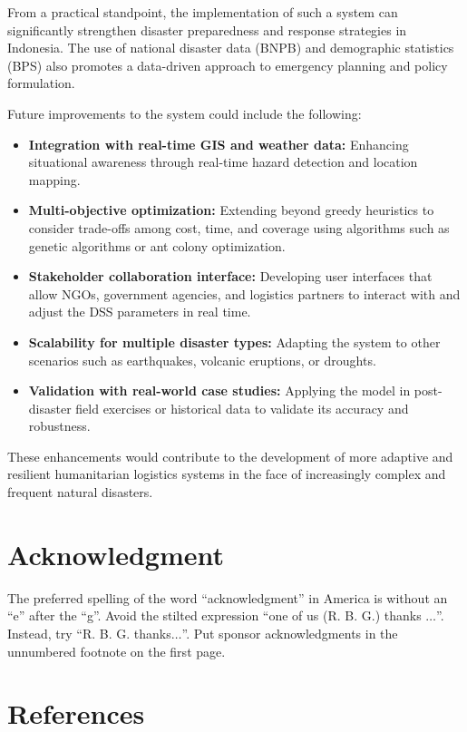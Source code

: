\documentclass[journal,final,a4paper,twoside,11pt]{IEEEtran}
\begin{document}
From a practical standpoint, the implementation of such a system can significantly strengthen disaster preparedness and response strategies in Indonesia. The use of national disaster data (BNPB) and demographic statistics (BPS) also promotes a data-driven approach to emergency planning and policy formulation.

Future improvements to the system could include the following:

\begin{itemize}
    \item \textbf{Integration with real-time GIS and weather data:} Enhancing situational awareness through real-time hazard detection and location mapping.
    \item \textbf{Multi-objective optimization:} Extending beyond greedy heuristics to consider trade-offs among cost, time, and coverage using algorithms such as genetic algorithms or ant colony optimization.
    \item \textbf{Stakeholder collaboration interface:} Developing user interfaces that allow NGOs, government agencies, and logistics partners to interact with and adjust the DSS parameters in real time.
    \item \textbf{Scalability for multiple disaster types:} Adapting the system to other scenarios such as earthquakes, volcanic eruptions, or droughts.
    \item \textbf{Validation with real-world case studies:} Applying the model in post-disaster field exercises or historical data to validate its accuracy and robustness.
\end{itemize}

These enhancements would contribute to the development of more adaptive and resilient humanitarian logistics systems in the face of increasingly complex and frequent natural disasters.


\section*{Acknowledgment}

The preferred spelling of the word ``acknowledgment'' in America is without 
an ``e'' after the ``g''. Avoid the stilted expression ``one of us (R. B. 
G.) thanks $\ldots$''. Instead, try ``R. B. G. thanks$\ldots$''. Put sponsor 
acknowledgments in the unnumbered footnote on the first page.

\section*{References}
\end{document}
